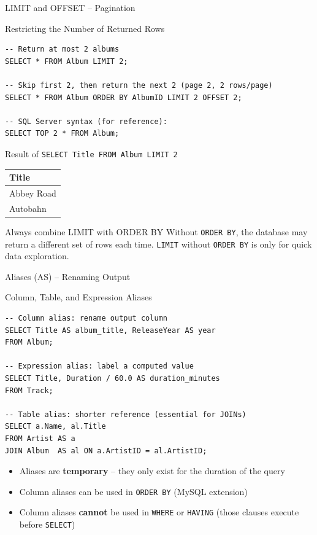 \begin{frame}[fragile]{LIMIT and OFFSET -- Pagination}
  \begin{block}{Restricting the Number of Returned Rows}
\begin{lstlisting}[style=sqlstyle]
-- Return at most 2 albums
SELECT * FROM Album LIMIT 2;

-- Skip first 2, then return the next 2 (page 2, 2 rows/page)
SELECT * FROM Album ORDER BY AlbumID LIMIT 2 OFFSET 2;

-- SQL Server syntax (for reference):
SELECT TOP 2 * FROM Album;
\end{lstlisting}
  \end{block}

  \begin{block}{Result of \texttt{SELECT Title FROM Album LIMIT 2}}
    \begin{tabular}{@{}l@{}}
      \toprule
      \textbf{Title} \\
      \midrule
      Abbey Road \\
      Autobahn \\
      \bottomrule
    \end{tabular}
  \end{block}

  \begin{alertblock}{Always combine LIMIT with ORDER BY}
    Without \texttt{ORDER BY}, the database may return a different set of rows
    each time. \texttt{LIMIT} without \texttt{ORDER BY} is only for quick
    data exploration.
  \end{alertblock}
\end{frame}

\begin{frame}[fragile]{Aliases (AS) -- Renaming Output}
  \begin{block}{Column, Table, and Expression Aliases}
\begin{lstlisting}[style=sqlstyle]
-- Column alias: rename output column
SELECT Title AS album_title, ReleaseYear AS year
FROM Album;

-- Expression alias: label a computed value
SELECT Title, Duration / 60.0 AS duration_minutes
FROM Track;

-- Table alias: shorter reference (essential for JOINs)
SELECT a.Name, al.Title
FROM Artist AS a
JOIN Album  AS al ON a.ArtistID = al.ArtistID;
\end{lstlisting}
  \end{block}

  \begin{itemize}
    \item Aliases are \textbf{temporary} -- they only exist for the duration of the query
    \item Column aliases can be used in \texttt{ORDER BY} (MySQL extension)
    \item Column aliases \textbf{cannot} be used in \texttt{WHERE} or \texttt{HAVING}
          (those clauses execute before \texttt{SELECT})
  \end{itemize}
\end{frame}

